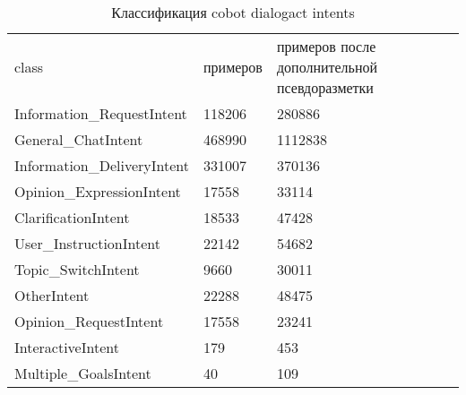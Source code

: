 \begin{table}[]
\caption{Классификация cobot dialogact intents}
\label{appendix:dci}
\begin{tabular}{lll}
class & примеров & примеров после дополнительной псевдоразметки \\
Information\_RequestIntent & 118206 & 280886 \\
General\_ChatIntent & 468990 & 1112838 \\
Information\_DeliveryIntent & 331007 & 370136 \\
Opinion\_ExpressionIntent & 17558 & 33114 \\
ClarificationIntent & 18533 & 47428 \\
User\_InstructionIntent & 22142 & 54682 \\
Topic\_SwitchIntent & 9660 & 30011 \\
OtherIntent & 22288 & 48475 \\
Opinion\_RequestIntent & 17558 & 23241 \\
InteractiveIntent & 179 & 453 \\
Multiple\_GoalsIntent & 40 & 109
\end{tabular}
\end{table}